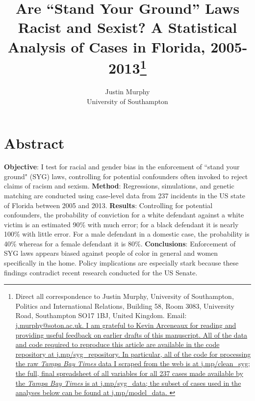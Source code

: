 \documentclass[12pt, oneside]{article}   	%
\title{Are ``Stand Your Ground'' Laws Racist and Sexist? A Statistical Analysis of Cases in Florida, 2005-2013\footnote{Direct all correspondence to Justin Murphy, University of Southampton, Politics and International Relations, Building 58, Room 3083, University Road, Southampton SO17 1BJ, United Kingdom. Email: \href{mailto:j.murphy@soton.ac.uk}{j.murphy@soton.ac.uk. I am grateful to Kevin Arceneaux for reading and providing useful feedback on earlier drafts of this manuscript. All of the
  data and code required to reproduce this article are available in the
  code repository at
  \href{http://j.mp/syg_repository}{j.mp/syg\_repository}. In
  particular, all of the code for processing the raw \emph{Tampa Bay
  Times} data I scraped from the web is at
  \href{http://j.mp/clean_syg}{j.mp/clean\_syg}; the full, final
  spreadsheet of all variables for all 237 cases made available by the
  \emph{Tampa Bay Times} is at
  \href{http://j.mp/syg_data}{j.mp/syg\_data}; the subset of cases used
  in the analyses below can be found at
  \href{http://j.mp/model_data}{j.mp/model\_data}.
}}}
\author{Justin Murphy\\University of Southampton}
\date{}
\begin{document}
\maketitle

\section*{Abstract}
\textbf{Objective}: I test for racial and gender bias in the enforcement of ``stand your ground" (SYG) laws, controlling for potential confounders often invoked to reject claims of racism and sexism. \textbf{Method}: Regressions, simulations, and genetic matching are conducted using case-level data from 237 incidents in the US state of Florida between 2005 and 2013. \textbf{Results}: Controlling for potential confounders, the probability of conviction for a white defendant against a white victim is an estimated 90\% with much error; for a black defendant it is nearly 100\% with little error. For a male defendant in a domestic case, the probability is 40\% whereas for a female defendant it is 80\%. \textbf{Conclusions}: Enforcement of SYG laws appears biased against people of color in general and women specifically in the home. Policy implications are especially stark because these findings contradict recent research conducted for the US Senate. 
\end{document}
